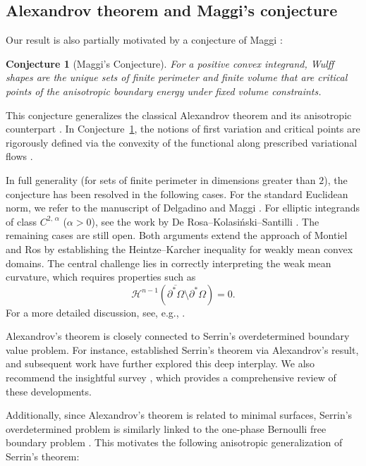\documentclass[reqno,11pt]{amsart}
\makeatletter
\def\az{\alpha}
\newtheorem{conj}[thm]{Conjecture}%
\numberwithin{equation}{section}
\theoremstyle{remark}
\makeatother
\begin{document}
\subsection{Alexandrov theorem and Maggi's conjecture}
Our result is also partially motivated by a conjecture of Maggi \cite{M2018}:
\begin{conj}[Maggi's Conjecture]\label{magg conj}
For a positive convex integrand, Wulff shapes are the unique sets of finite perimeter and finite volume that are critical points of the anisotropic boundary energy under fixed volume constraints.
\end{conj}
This conjecture generalizes the classical Alexandrov theorem \cite{A1958, A1962} and its anisotropic counterpart \cite{HLMG2009}. In Conjecture~\ref{magg conj}, the notions of first variation and critical points are rigorously defined via the convexity of the functional along prescribed variational flows \cite[pages 35-36]{M2018}.

In full generality (for sets of finite perimeter in dimensions greater than $2$), the conjecture has been resolved in the following cases. For the standard Euclidean norm, we refer to the manuscript of Delgadino and Maggi \cite{DM2019}. For elliptic integrands of class $C^{2,\,\az}$ ($\az>0$),  see the work by De Rosa--Kolasi\'nski--Santilli \cite{DKS2020}. The remaining cases are still open. 
Both arguments extend the approach of Montiel and Ros \cite{MR1991} by establishing the Heintze--Karcher inequality for weakly mean convex domains. The central challenge lies in correctly interpreting the weak mean curvature, which requires properties such as
$$\mathscr H^{n-1}(\overline {\partial^*\Omega}\setminus \partial^*\Omega)=0.$$
For a more detailed discussion, see, e.g., \cite[Section 4]{D2024}.


Alexandrov's theorem is closely connected to Serrin's overdetermined boundary value problem. For instance, \cite{CH1998} established Serrin's theorem via Alexandrov's result, and subsequent work \cite{CM2017, MP2019, MP2020} have further explored this deep interplay. We also recommend the insightful survey \cite{M2017}, which provides a comprehensive review of these developments.

Additionally, since Alexandrov's theorem is related to minimal surfaces, Serrin's overdetermined problem is similarly linked to the one-phase Bernoulli free boundary problem \cite{V2023}. This motivates the following anisotropic generalization of Serrin's theorem:
\end{document}
